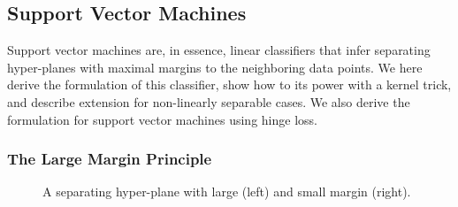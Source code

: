 \begin{refsection}
\subsection*{Support Vector Machines}

Support vector machines are, in essence, linear classifiers that infer separating hyper-planes with maximal margins to the neighboring data points. We here derive the formulation of this classifier, show how to its power with a kernel trick, and describe extension for non-linearly separable cases. We also derive the formulation for support vector machines using hinge loss.

\subsubsection*{The Large Margin Principle}

\begin{figure}[htbp]
\caption{A separating hyper-plane with large (left) and small margin (right).}
\label{fig:svm-lin-sep}
\end{figure}


\end{refsection}
